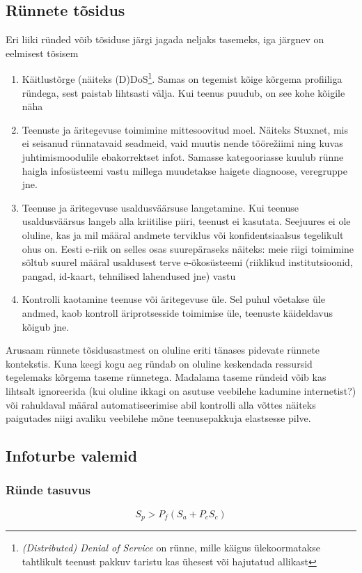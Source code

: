 \documentclass{article}
\begin{document}
\subsection{Rünnete tõsidus}
Eri liiki ründed võib tõsiduse järgi jagada neljaks tasemeks, iga järgnev on eelmisest tõsisem

\begin{enumerate}
	\item Käitlustõrge (näiteks (D)DoS\footnote{\emph{(Distributed) Denial of Service} on rünne, mille käigus ülekoormatakse tahtlikult teenust pakkuv taristu kas ühesest või hajutatud allikast}. Samas on tegemist kõige kõrgema profiiliga ründega, sest paistab lihtsasti välja. Kui teenus puudub, on see kohe kõigile näha
	\item Teenuste ja äritegevuse toimimine mittesoovitud moel. Näiteks Stuxnet, mis ei seisanud rünnatavaid seadmeid, vaid muutis nende tööre\v{z}iimi ning kuvas juhtimismoodulile ebakorrektset infot. Samasse kategooriasse kuulub rünne haigla infosüsteemi vastu millega muudetakse haigete diagnoose, veregruppe jne. 
	\item Teenuse ja äritegevuse usaldusväärsuse langetamine. Kui teenuse usaldusväärsus langeb alla kriitilise piiri, teenust ei kasutata. Seejuures ei ole oluline, kas ja mil määral andmete terviklus või konfidentsiaalsus tegelikult ohus on. Eesti e-riik on selles osas suurepäraseks näiteks: meie riigi toimimine sõltub suurel määral usaldusest terve e-ökosüsteemi (riiklikud institutsioonid, pangad, id-kaart, tehnilised lahendused jne) vastu 
	\item Kontrolli kaotamine teenuse või äritegevuse üle. Sel puhul võetakse üle andmed, kaob kontroll äriprotsesside toimimise üle, teenuste käideldavus kõigub jne.
\end{enumerate}

Arusaam rünnete tõsidusastmest on oluline eriti tänases pidevate rünnete kontekstis. Kuna keegi kogu aeg ründab on oluline keskendada ressursid tegelemaks kõrgema taseme rünnetega. Madalama taseme ründeid võib kas lihtsalt ignoreerida (kui oluline ikkagi on asutuse veebilehe kadumine internetist?) või rahuldaval määral automatiseerimise abil kontrolli alla võttes näiteks paigutades niigi avaliku veebilehe mõne teenusepakkuja elastsesse pilve.

\subsection{Infoturbe valemid} 
\label{sec:valemid}
\subsubsection{Ründe tasuvus}
\begin{equation}
		S_p>P_f(S_a + P_c S_c)
		\label{eq:tasuvus}
\end{equation}
\end{document}
